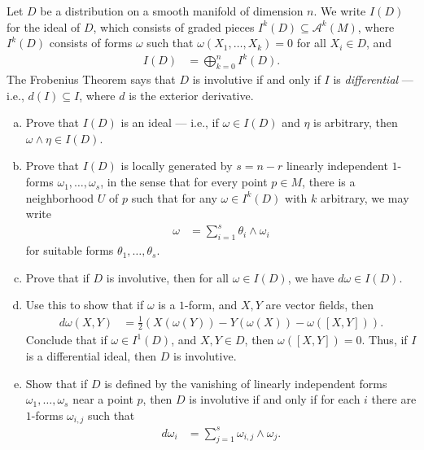 \documentclass[10pt]{mypackage}
\begin{document}
\begin{problem}[Problem 4]
  Let $D$ be a distribution on a smooth manifold of dimension $n$. We write $I(D)$ for the ideal of $D$, which consists of graded pieces $I^{k}\left( D \right)\subseteq \mathcal{A}^{k}\left( M \right)$, where $I^{k}\left( D \right)$ consists of forms $\omega$ such that $\omega\left( X_1,\dots,X_k \right) = 0$ for all $X_i\in D$, and
  \begin{align*}
    I(D) &= \bigoplus_{k=0}^{n} I^{k}\left( D \right).
  \end{align*}
  The Frobenius Theorem says that $D$ is involutive if and only if $I$ is \textit{differential} --- i.e., $d(I)\subseteq I$, where $d$ is the exterior derivative.
  \begin{enumerate}[(a)]
    \item Prove that $I(D)$ is an ideal --- i.e., if $\omega\in I(D)$ and $\eta$ is arbitrary, then $\omega \wedge \eta \in I(D)$.
    \item Prove that $I(D)$ is locally generated by $ s = n-r $ linearly independent $1$-forms $\omega_1,\dots,\omega_s$, in the sense that for every point $p\in M$, there is a neighborhood $U$ of $p$ such that for any $\omega\in I^{k}\left( D \right)$ with $k$ arbitrary, we may write
      \begin{align*}
        \omega &= \sum_{i=1}^{s} \theta_i\wedge \omega_i
      \end{align*}
      for suitable forms $\theta_1,\dots,\theta_s$.
    \item Prove that if $D$ is involutive, then for all $\omega\in I(D)$, we have $d\omega\in I(D)$.
    \item Use this to show that if $\omega$ is a $1$-form, and $X,Y$ are vector fields, then
      \begin{align*}
        d\omega\left( X,Y \right) &= \frac{1}{2}\left( X\left( \omega(Y) \right) - Y\left( \omega(X) \right) - \omega\left( \left[ X,Y \right] \right) \right).
      \end{align*}
      Conclude that if $\omega\in I^{1}\left( D \right)$, and $X,Y\in D$, then $\omega\left( \left[ X,Y \right] \right) = 0$. Thus, if $I$ is a differential ideal, then $D$ is involutive.
    \item Show that if $D$ is defined by the vanishing of linearly independent forms $\omega_1,\dots,\omega_s$ near a point $p$, then $D$ is involutive if and only if for each $i$ there are $1$-forms $\omega_{i,j}$ such that
      \begin{align*}
        d\omega_i &= \sum_{j=1}^{s}\omega_{i,j}\wedge \omega_j.
      \end{align*}
  \end{enumerate}
\end{problem}
\end{document}
